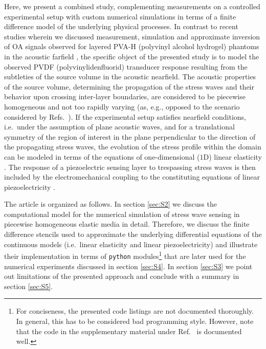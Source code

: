 \documentclass[5p,times,twocolumn]{elsarticle}
\begin{document}
Here, we present a combined study, complementing measurements on a controlled
experimental setup with custom numerical simulations in terms of a finite
difference model of the underlying physical processes.  In contrast to recent
studies wherein we discussed measurement, simulation and approximate inversion
of OA signals observed for layered PVA-H (polyvinyl alcohol hydrogel) phantoms
in the acoustic farfield \cite{Blumenroether:2016,Melchert:2017}, the specific
object of the presented study is to model the observed PVDF
(polyvinylidenfluorid) transducer response resulting from the subtleties of the
source volume in the acoustic nearfield.  The acoustic properties of the source
volume, determining the propagation of the stress waves and their behavior upon
crossing inter-layer boundaries, are considered to be piecewise homogeneous and
not too rapidly varying (as, e.g., opposed to the scenario considered by Refs.\
\cite{Santosa:1991,Fogarty:1999}).
If the experimental setup satisfies nearfield conditions, i.e.\ under the
assumption of plane acoustic waves, and for a translational symmetry of the
region of interest in the plane perpendicular to the direction of the
propagating stress waves, the evolution of the stress profile within the domain
can be modeled in terms of the equations of one-dimensional ($1$D) linear
elasticity \cite{Landau:1975,Tam:1986,Irgens:2008}. The response of a
piezoelectric sensing layer to trespassing stress waves is then included by the
electromechanical coupling to the constituting equations of linear
piezoelectricity \cite{Szabo:2004}. 


The article is organized as follows. In section \ref{sec:S2} we discuss the
computational model for the numerical simulation of stress wave sensing in
piecewise homogeneous elastic media in detail. Therefore, we discuss the finite
difference stencils used to approximate the underlying differential equations
of the continuous models (i.e.\ linear elasticity and linear piezoelectricity)
and illustrate their implementation in terms of {\tt python}
modules\footnote{For conciseness, the presented code listings are not
documented thoroughly. In general, this has to be considered bad programming
style.  However, note that the code in the supplementary material under Ref.\
\cite{Melchert_gitHub_1DFD:2017} is documented well.} that are later used for
the numerical experiments discussed in section \ref{sec:S4}. In section
\ref{sec:S3} we point out limitations of the presented approach and conclude
with a summary in section \ref{sec:S5}.
 
\end{document}

